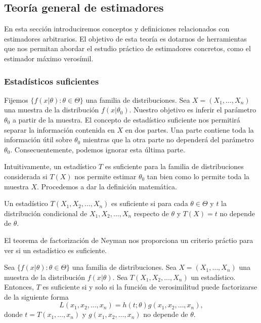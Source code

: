 \documentclass{article}
\begin{document}
    \subsection{Teoría general de estimadores}

    En esta sección introduciremos conceptos y definiciones relacionados con estimadores arbitrarios. El objetivo de esta teoría es dotarnos de herramientas que nos permitan abordar el estudio práctico de estimadores concretos, como el estimador máximo verosímil.

    \subsubsection{Estadísticos suficientes} \label{sec:estimacion:tge:sufi}

        Fijemos $\{f(x|\theta): \theta \in \Theta\}$ una familia de distribuciones. Sea $X = (X_1 , \ldots, X_n)$ una muestra de la distribución $f(x|\theta_0)$. Nuestro objetivo es inferir el parámetro $\theta_0$ a partir de la muestra. El concepto de estadístico suficiente nos permitirá separar la información contenida en $X$ en dos partes. Una parte contiene toda la información útil sobre $\theta_0$ mientras que la otra parte no dependerá del parámetro $\theta_0$. Consecuentemente, podemos ignorar esta última parte.

        Intuitivamente, un estadístico $T$ es suficiente para la familia de distribuciones considerada si $T(X)$ nos permite estimar $\theta_0$ tan bien como lo permite toda la muestra $X$. Procedemos a dar la definición matemática.

        \begin{definition}
            Un estadístico $T(X_1, X_2, \ldots, X_n)$ es suficiente si para cada $\theta \in \Theta$ y $t$ la distribución condicional de $X_1, X_2, \ldots, X_n$ respecto de $\theta$ y $T(X) = t$ no depende de $\theta$.
        \end{definition}

        El teorema de factorización de Neyman nos proporciona un criterio práctio para ver si un estadístico es suficiente.

        \begin{thm}
            Sea $\{f(x|\theta): \theta \in \Theta\}$ una familia de distribuciones. Sea $X = (X_1 , \ldots, X_n)$ una muestra de la distribución $f(x|\theta)$. Sea $T(X_1, X_2, \ldots, X_n)$ un estadístico. Entonces, $T$ es  suficiente si y solo si la función de verosimilitud puede factorizarse de la siguiente forma
            \[L(x_1, x_2, \ldots, x_n) = h(t;\theta) g(x_1, x_2, \ldots, x_n),\]
            donde $t = T(x_1, \ldots, x_n)$ y $g(x_1, x_2, \ldots, x_n)$ no depende de $\theta$.
        \end{thm}
\end{document}
